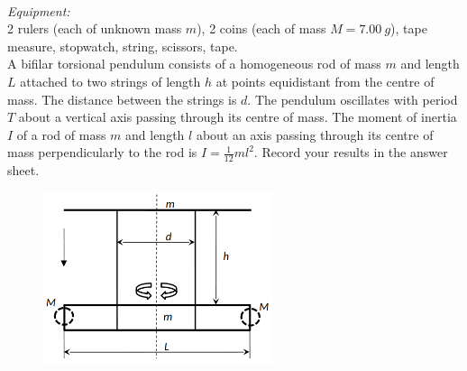 \documentclass[../TST.tex]{subfiles}
\begin{document}
\begin{eproblem}{\ \\[5pt]}
\textit{Equipment:}\\
2 rulers (each of unknown mass $m$), 2 coins (each of mass $M=\qty{7.00}{g}$), tape measure, stopwatch, string, scissors, tape.\\

A bifilar torsional pendulum consists of a homogeneous rod of mass $m$ and length $L$ attached to two strings of length $h$ at points equidistant from the centre of mass. The distance between the strings is $d$. The pendulum oscillates with period $T$ about a vertical axis passing through its centre of mass. The moment of inertia $I$ of a rod of mass $m$ and length $l$ about an axis passing through its centre of mass perpendicularly to the rod is $I=\frac{1}{12}ml^2$. Record your results in the answer sheet.
\begin{figure}[h]
\centering
\includegraphics[width=0.6\textwidth]{fig/2016_e1.png}
\caption{}
\label{fig1}
\end{figure}


\end{eproblem}
\end{document}
